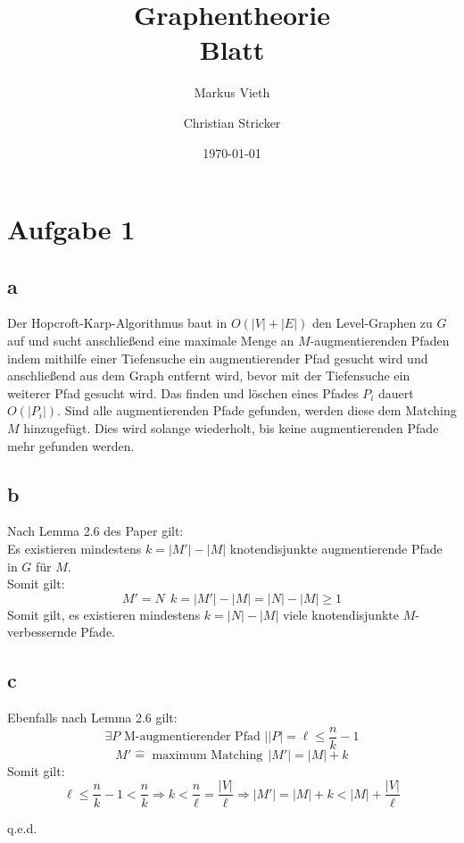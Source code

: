\documentclass[a4paper,11pt,twoside]{scrartcl}
\title{Graphentheorie\\ Blatt }
\author{Markus Vieth\and Christian Stricker}
\date{\today}
\newcommand{\qed}{%
	\begin{flushright}
		q.e.d.
	\end{flushright}%
	}
\begin{document}
\maketitle
\cleardoublepage
\pagestyle{myheadings}

\newpage
\section*{Aufgabe 1}
\vspace*{-1.5em}
\subsection*{a}
Der Hopcroft-Karp-Algorithmus baut in $O(|V| + |E|)$ den Level-Graphen zu $G$ auf und sucht anschließend eine maximale Menge an $M$-augmentierenden Pfaden indem mithilfe einer Tiefensuche ein augmentierender Pfad gesucht wird und anschließend aus dem Graph entfernt wird, bevor mit der Tiefensuche ein weiterer Pfad gesucht wird. Das finden und löschen eines Pfades $P_i$ dauert $O(|P_i|)$. Sind alle augmentierenden Pfade gefunden, werden diese dem Matching $M$ hinzugefügt. Dies wird solange wiederholt, bis keine augmentierenden Pfade mehr gefunden werden.
\vspace*{-1.5em}
\subsection*{b}
Nach Lemma 2.6 des Paper gilt:\\
Es existieren mindestens $k = |M'| - |M|$ knotendisjunkte augmentierende Pfade in $G$ für $M$.\\
Somit gilt:
\[ M' = N~~k = |M'| - |M| = |N| - |M| \geq 1 \]
Somit gilt, es existieren mindestens $k=|N| - |M|$ viele knotendisjunkte $M$-verbessernde Pfade.
\vspace*{-1.5em}
\subsection*{c}
Ebenfalls nach Lemma 2.6 gilt:
\[ \exists P \text{ M-augmentierender Pfad } | |P| = \ell \leq \frac{n}{k} - 1  \]
\vspace*{-1.5em}
\[ M' \hat{=} \text{ maximum Matching}~~|M'| = |M| + k \]
\vspace*{-1.5em}
Somit gilt:
\[ \ell \leq \frac{n}{k} - 1 < \frac{n}{k} \Rightarrow k < \frac{n}{\ell} = \frac{|V|}{\ell} \Rightarrow |M'| = |M| + k < |M| + \frac{|V|}{\ell} \]
\qed
\vspace*{-3em}
\end{document}

